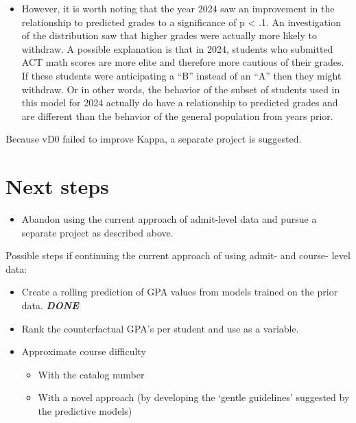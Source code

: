 \documentclass[
]{article}
\providecommand{\tightlist}{%
  \setlength{\itemsep}{0pt}\setlength{\parskip}{0pt}}
\begin{document}
\begin{itemize}
  \begin{itemize}
  \tightlist
  \item
    However, it is worth noting that the year 2024 saw an improvement in
    the relationship to predicted grades to a significance of p
    \textless{} .1. An investigation of the distribution saw that higher
    grades were actually more likely to withdraw. A possible explanation
    is that in 2024, students who submitted ACT math scores are more
    elite and therefore more cautious of their grades. If these students
    were anticipating a ``B'' instead of an ``A'' then they might
    withdraw. Or in other words, the behavior of the subset of students
    used in this model for 2024 actually do have a relationship to
    predicted grades and are different than the behavior of the general
    population from years prior.
  \end{itemize}
\end{itemize}

Because vD0 failed to improve Kappa, a separate project is suggested.

\section{Next steps}\label{next-steps}

\begin{itemize}
\tightlist
\item
  Abandon using the current approach of admit-level data and pursue a
  separate project as described above.
\end{itemize}

Possible steps if continuing the current approach of using admit- and
course- level data:

\begin{itemize}
\item
  Create a rolling prediction of GPA values from models trained on the
  prior data. \textbf{\emph{DONE}}
\item
  Rank the counterfactual GPA's per student and use as a variable.
\item
  Approximate course difficulty

  \begin{itemize}
  \tightlist
  \item
    With the catalog number
  \item
    With a novel approach (by developing the `gentle guidelines'
    suggested by the predictive models)
  \end{itemize}
\end{itemize}
\end{document}
